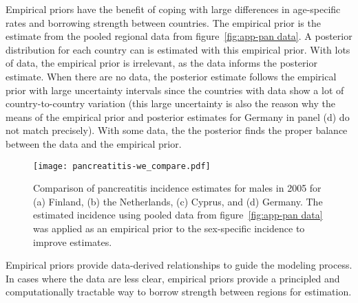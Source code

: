 Empirical priors have the benefit of coping with large differences in age-specific
rates and borrowing strength between countries.  The empirical prior is the
estimate from the pooled regional data from figure~\ref{fig:app-pan data}.  A 
posterior distribution for each country can is estimated with this empirical prior.  
With lots of data, the empirical prior is irrelevant, as the data informs the 
posterior estimate.  When there are no data, 
the posterior estimate follows the empirical prior with large
uncertainty intervals since the countries with data show a lot of
country-to-country variation (this large uncertainty is also the
reason why the means of the empirical prior and posterior estimates for Germany
in panel (d) do not match precisely).  With some data, the the posterior finds the 
proper balance between the data and the empirical prior.

    \begin{figure}[h]
        \begin{center}
            \texttt{[image: pancreatitis-we\_compare.pdf]}
            \caption[Comparison of pancreatitis incidence estimates.]
             {Comparison of pancreatitis incidence estimates
              for males in 2005 for (a) Finland, (b) the Netherlands, (c)
              Cyprus, and (d) Germany.  The estimated incidence using
              pooled data from figure~\ref{fig:app-pan data} was
              applied as an empirical prior to the sex-specific
              incidence to improve estimates.}
            \label{fig:app-pan compare}
        \end{center}
    \end{figure}

Empirical priors provide data-derived relationships to guide the
modeling process.  In cases where the data are less clear, empirical
priors provide a principled and computationally tractable way to
borrow strength between regions for estimation.
